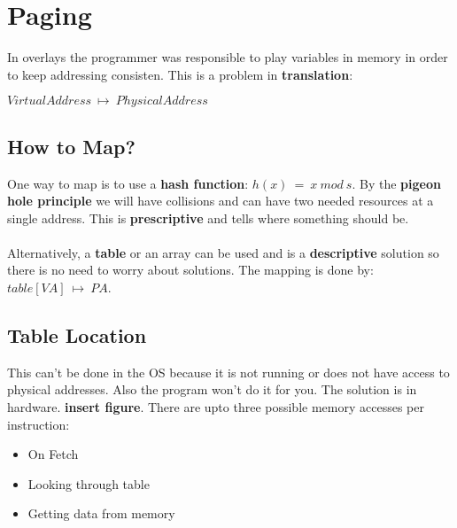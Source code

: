 \documentclass[../base_file/cs1550_notes.tex]{subfiles}
\begin{document}
\section{Paging}
In overlays the programmer was responsible to play variables in memory in order to keep addressing
consisten.  This is a problem in \textbf{translation}:
\begin{center}
$Virtual Address\ \longmapsto\ Physical Address$
\end{center}
\subsection{How to Map?}
One way to map is to use a \textbf{hash function}: $h(x)\ =\ x\ mod\ s$.  By the \textbf{pigeon hole
principle} we will have collisions and can have two needed resources at a single address. This is 
\textbf{prescriptive} and tells where something should be.\\\\
Alternatively, a \textbf{table} or an array can be used and is a \textbf{descriptive} solution 
so there is no need to worry about solutions.  The mapping is done by: $table[VA]\ \longmapsto\ PA$.
\subsection{Table Location}
This can't be done in the OS because  it is not running or does not have access to physical addresses.
Also the program won't do it for you.  The solution is in hardware. \textbf{insert figure}.  There are
upto three possible memory accesses per instruction:
\begin{itemize}
	\item On Fetch
	\item Looking through table
	\item Getting data from memory
\end{itemize}
\end{document}
